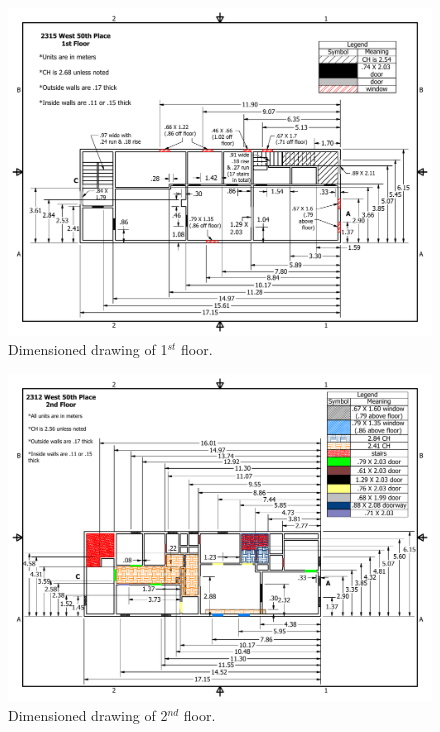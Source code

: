 \documentclass[11pt,oneside]{book}
\begin{document}
\begin{figure}[h!]
\centering
\includegraphics[width=.80\textwidth]{../Figures/50th_Place_1st_Floor}
\caption {Dimensioned drawing of 1$^{st}$ floor.}
\label{fig:first_floor}
\end{figure}

\begin{figure}[h!]
\centering
\includegraphics[width=.80\textwidth]{../Figures/50th_Place_2nd_Floor}
\caption {Dimensioned drawing of 2$^{nd}$ floor.}
\label{fig:second_floor}
\end{figure}
\end{document}
